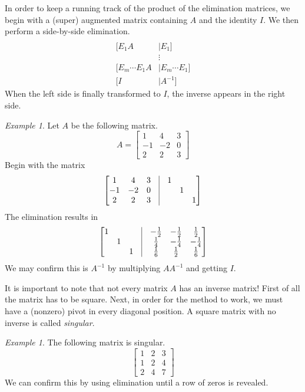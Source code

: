 \documentclass[11pt,oneside]{amsbook}
\theoremstyle{definition}
\theoremstyle{plain}
\theoremstyle{definition}
\theoremstyle{remark}
\newtheorem{example}[theorem]{Example}
\numberwithin{equation}{section}
\numberwithin{figure}{section}
\begin{document}
In order to keep a running track of the product of the elimination matrices, we begin with a (super) augmented matrix containing $A$ and the identity $I$. We then perform a side-by-side elimination.
\begin{align*}
  [A&\mid I]\\
  [E_1A&\mid E_1]\\
    &\vdots\\
  [E_m\cdots E_1A&\mid E_m\cdots E_1]\\
  [I&\mid A^{-1}]
\end{align*}
When the left side is finally transformed to $I$, the inverse appears in the right side.

\begin{example}
  Let $A$ be the following matrix.
  \[A=\begin{bmatrix}1&4&3\\-1&-2&0\\2&2&3\end{bmatrix}
  \]
  Begin with the matrix
  \[\begin{bmatrix}
    1&4&3&\vline&1\\
    -1&-2&0&\vline&&1\\
    2&2&3&\vline&&&1
    \end{bmatrix}
  \]
  The elimination results in
  \[\begin{bmatrix}
    1&&&\vline&-\frac12&-\frac12&\frac12\\
    &1&&\vline&\frac14&-\frac14&-\frac14\\
    &&1&\vline&\frac16&\frac12&\frac16
    \end{bmatrix}
  \]
  We may confirm this is $A^{-1}$ by multiplying $AA^{-1}$ and getting $I$.
\end{example}

It is important to note that not every matrix $A$ has an inverse matrix! First of all the matrix has to be square. Next, in order for the method to work, we must have a (nonzero) pivot in every diagonal position. A square matrix with no inverse is called \emph{singular}.

\begin{example}
  The following matrix is singular.
  \[\begin{bmatrix}1&2&3\\1&2&4\\2&4&7\end{bmatrix}
  \]
  We can confirm this by using elimination until a row of zeros is revealed.
\end{example}
\end{document}

